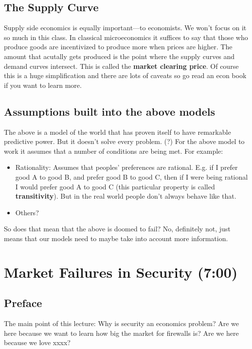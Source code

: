 \documentclass[11pt]{article}
\begin{document}
\subsection{The Supply Curve}

Supply side economics is equally important---to economists. We won't focus on it so much in this class. In classical microeconomics it suffices to say that those who produce goods are incentivized to produce more when prices are higher. The amount that acutally gets produced is the point where the supply curves and demand curves intersect. This is called the {\bf market clearing price}. Of course this is a huge simplification and there are lots of caveats so go read an econ book if you want to learn more. 


\subsection{Assumptions built into the above models}

The above is a model of the world that has proven itself to have remarkable predictive power.
But it doesn't solve every problem. (?)
For the above model to work it assumes that a number of conditions are being met. For example:

\begin{itemize}
    \item Rationality: Assumes that peoples' preferences are rational. E.g. if I prefer good A to good B, and prefer good B to good C, then if I were being rational I would prefer good A to good C (this particular property is called {\bf transitivity}). But in the real world people don't always behave like that.
    \item Others? 
\end{itemize}

So does that mean that the above is doomed to fail? No, definitely not, just means that our models need to maybe take into account more information.

\section{Market Failures in Security (7:00)}


\subsection{Preface}

The main point of this lecture: Why is security an economics problem? Are we here because we want to learn how big the market for firewalls is? Are we here because we love xxxx?
\end{document}
